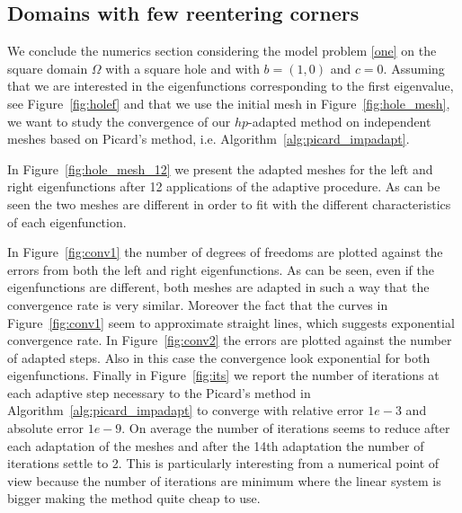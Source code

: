 \documentclass[smallextended]{svjour3}
\begin{document}
\subsection{Domains with few reentering corners}\label{ssec:reent}

We conclude the numerics section considering the model problem \eqref{one} on the square domain $\Omega$ with a square hole and with $b=(1,0)$ and $c=0$. Assuming that we are interested in the eigenfunctions corresponding to the first eigenvalue, see Figure~\ref{fig:holef} and that we use the initial mesh in Figure~\ref{fig:hole_mesh}, we want to study the convergence of our $hp$-adapted method on independent meshes based on Picard's method, i.e. Algorithm~\ref{alg:picard_impadapt}.

In Figure~\ref{fig:hole_mesh_12} we present the adapted meshes for the left and right eigenfunctions after 12 applications of the adaptive procedure. As can be seen the two meshes are different in order to fit with the different characteristics of each eigenfunction.

In Figure~\ref{fig:conv1} the number of degrees of freedoms are plotted against the errors from both the left and right eigenfunctions. As can be seen, even if the eigenfunctions are different, both meshes are adapted in such a way that the convergence rate is very similar. Moreover the fact that the curves in Figure~\ref{fig:conv1} seem to approximate straight lines, which suggests exponential convergence rate. In Figure~\ref{fig:conv2} the errors are plotted against the number of adapted steps. Also in this case the convergence look exponential for both eigenfunctions.
Finally in Figure~\ref{fig:its} we report the number of iterations at each adaptive step necessary to the Picard's method in Algorithm~\ref{alg:picard_impadapt} to converge with relative error $1e-3$ and absolute error $1e-9$.
On average the number of iterations seems to reduce after each adaptation of the meshes and after the 14th adaptation the number of iterations settle to 2. This is particularly interesting from a numerical point of view because the number of iterations are minimum where the linear system is bigger making the method quite cheap to use.
\end{document}
